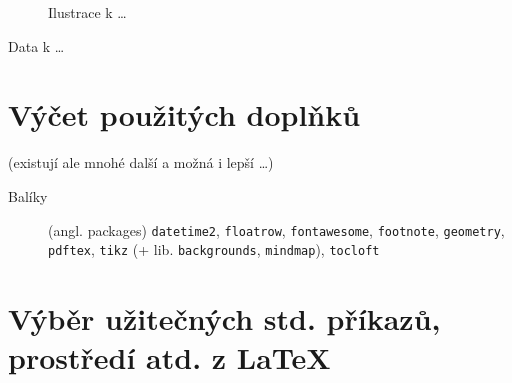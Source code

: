\documentclass[a4paper,11pt, twoside]{report}
\begin{document}
\begin{figure}[h]
\centering
\scalebox{5.0}{
	\faLineChart
}
\caption{Ilustrace k \ldots}
\label{fig:C-2}
\end{figure}

\begin{table}[h]
\centering
\scalebox{5.0}{
	\faTable
}
\caption{Data k \ldots}
\label{tbl:C-2}
\end{table}

\section{Výčet použitých doplňků}

(existují ale mnohé další a možná i lepší \ldots)

\begin{description}
\item[Balíky] (angl. packages)
\texttt{datetime2}, \texttt{floatrow}, \texttt{fontawesome}, \texttt{footnote}, \texttt{geometry}, \texttt{pdftex}, \texttt{tikz} (+ lib. \texttt{backgrounds}, \texttt{mindmap}), \texttt{tocloft}
\end{description}

\section{Výběr užitečných std. příkazů, prostředí atd. z \LaTeX}
\end{document}
